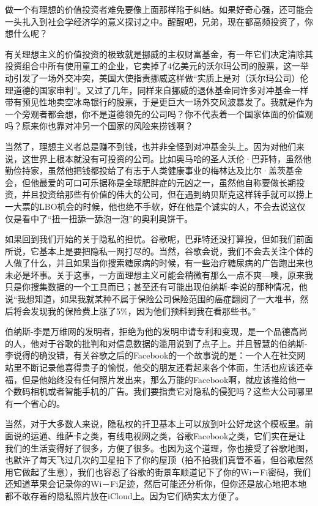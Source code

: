 做一个有理想的价值投资者难免要像上面那样陷于纠结。如果好奇心强，还可能会一头扎入到社会学经济学的意义探讨之中。醒醒吧，兄弟，现在都高频投资了，你想什么呢？

有关理想主义的价值投资的极致就是挪威的主权财富基金，有一年它们决定清除其投资组合中所有使用童工的企业，它卖掉了4亿美元的沃尔玛公司的股票，这一举动引发了一场外交冲突，美国大使指责挪威这样做``实质上是对（沃尔玛公司）伦理道德的国家审判''。又过了几年，同样来自挪威的退休基金同许多对冲基金一样带有预见性地卖空冰岛银行的股票，于是更巨大一场外交风波暴发了。我就是作为一个旁观者都会想，你不是道德领先的公司吗？你不代表着一个国家体面的价值观吗？原来你也靠对冲另一个国家的风险来捞钱啊？

当然了，理想主义者总是赚不到钱，也并非全怪到对冲基金头上。因为对他们来说，这世界上根本就没有可投资的公司。比如奥马哈的圣人沃伦·巴菲特，虽然他勤俭持家，虽然他把钱都投给了有志于人类健康事业的梅林达及比尔·盖茨基金会，但他最爱的可口可乐据称是全球肥胖症的元凶之一，虽然他自称要做长期投资，并且投资给那些有价值的伟大的公司，但在遇到纳贝斯克这样转手就可以捞上一大票的LBO机会的时候，他也绝不手软，好在他是个诚实的人，不会去说这仅仅是看中了``扭一扭舔一舔泡一泡''的奥利奥饼干。

如果回到我们开始的关于隐私的担忧。谷歌呢，巴菲特还没打算投，但如我们前面所说，它基本上是要把隐私一网打尽的。当然，谷歌会说，我们不会去关注个体的人做了什么，并且如果当你搜索糖尿病的时候，有一些治疗糖尿病的广告跑出来也未必是坏事。关于这事，一方面理想主义可能会稍微有那么一点不爽---噢，原来我只是你搜集数据的一个工具而已；甚至还有可能出现伯纳斯-李说的那种情况，他说``我想知道，如果我就某种不属于保险公司保险范围的癌症翻阅了一大堆书，然后将会发现我的保险费上涨了5\%，因为他们预料到我在看那些书。''

伯纳斯-李是万维网的发明者，拒绝为他的发明申请专利和变现，是一个品德高尚的人，他对于谷歌的批判和对信息数据的滥用说到了点子上。并且智慧的伯纳斯-李说得的确没错，有关谷歌之后的Facebook的一个故事说的是：一个人在社交网站里不断记录他喜得贵子的愉悦，他交的朋友还看起来各个体面，生活也应该还幸福，但是他始终没有任何照片发出来，那么万能的Facebook啊，就应该推给他一个数码相机或者智能手机的广告。我们要指责它对隐私的侵犯吗？这些大公司哪里有一个省心的。

当然，对于大多数人来说，隐私权的扞卫基本上可以放到叶公好龙这个模板里。前面说的运通、维萨卡之类，有线电视网之类，谷歌Facebook之类，它们实在是让我们的生活变得好了很多，方便了很多。也因为这个道理，你也接受了谷歌地图，也默许了每天飞过几次的卫星拍下了你的屋顶（拍不拍我们真管不着，但谷歌居然用它做起了生意），我们也容忍了谷歌的街景车顺道记下了你的Wi－Fi密码，我们还知道苹果会记录你的Wi－Fi足迹，然后可能还分析你，但你还是放心地把本地都不敢存着的隐私照片放在iCloud上。因为它们确实太方便了。

